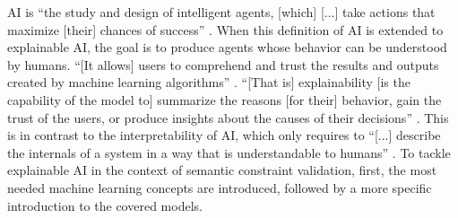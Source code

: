 
    AI is ``the study and design of intelligent agents, [which] [...] take actions that maximize [their] chances of success'' \cite{russell2002artificial}. When this definition of AI is extended to explainable AI, the goal is to produce agents whose behavior can be understood by humans. ``[It allows] users to comprehend and trust the results and outputs created by machine learning algorithms'' \cite{ibmExplainableAI}. ``[That is] explainability [is the capability of the model to] summarize the reasons [for their] behavior, gain the trust of the users, or produce insights about the causes of their decisions'' \cite{gilpin2018explaining}. This is in contrast to the interpretability of AI, which only requires to ``[...] describe the internals of a
    system in a way that is understandable to humans'' \cite{gilpin2018explaining}. To tackle explainable AI in the context of semantic constraint validation, first, the most needed machine learning concepts are introduced, followed by a more specific introduction to the covered models.